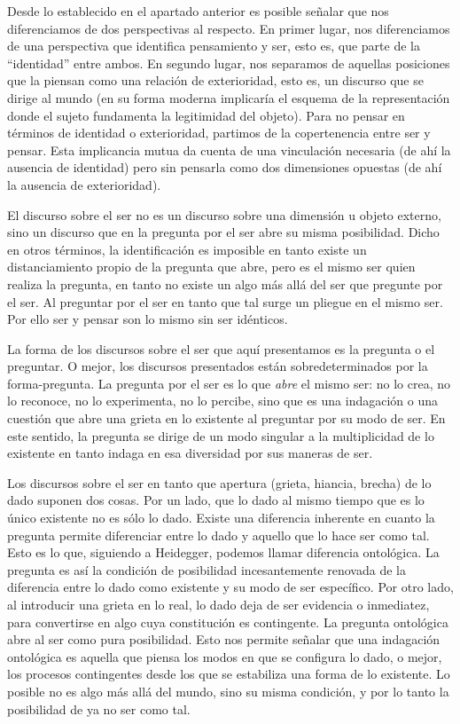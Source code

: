 \documentclass{book}
\begin{document}
Desde lo establecido en el apartado anterior es posible señalar que nos
diferenciamos de dos perspectivas al respecto. En primer lugar, nos
diferenciamos de una perspectiva que identifica pensamiento y ser, esto
es, que parte de la \enquote{identidad} entre ambos. En segundo lugar, nos
separamos de aquellas posiciones que la piensan como una relación de
exterioridad, esto es, un discurso que se dirige al mundo (en su forma
moderna implicaría el esquema de la representación donde el sujeto
fundamenta la legitimidad del objeto). Para no pensar en términos de
identidad o exterioridad, partimos de la copertenencia entre ser y
pensar. Esta implicancia mutua da cuenta de una vinculación necesaria
(de ahí la ausencia de identidad) pero sin pensarla como dos dimensiones
opuestas (de ahí la ausencia de exterioridad).

El discurso sobre el ser no es un discurso sobre una dimensión u objeto
externo, sino un discurso que en la pregunta por el ser abre su misma
posibilidad. Dicho en otros términos, la identificación es imposible en
tanto existe un distanciamiento propio de la pregunta que abre, pero es
el mismo ser quien realiza la pregunta, en tanto no existe un algo más
allá del ser que pregunte por el ser. Al preguntar por el ser en tanto
que tal surge un pliegue en el mismo ser. Por ello ser y pensar son lo
mismo sin ser idénticos.

La forma de los discursos sobre el ser que aquí presentamos es la
pregunta o el preguntar. O mejor, los discursos presentados están
sobredeterminados por la forma-pregunta. La pregunta por el ser es lo
que \emph{abre} el mismo ser: no lo crea, no lo reconoce, no lo
experimenta, no lo percibe, sino que es una indagación o una cuestión
que abre una grieta en lo existente al preguntar por su modo de ser. En
este sentido, la pregunta se dirige de un modo singular a la
multiplicidad de lo existente en tanto indaga en esa diversidad por sus
maneras de ser.

Los discursos sobre el ser en tanto que apertura (grieta, hiancia,
brecha) de lo dado suponen dos cosas. Por un lado, que lo dado al mismo
tiempo que es lo único existente no es sólo lo dado. Existe una
diferencia inherente en cuanto la pregunta permite diferenciar entre lo
dado y aquello que lo hace ser como tal. Esto es lo que, siguiendo a
Heidegger, podemos llamar diferencia ontológica. La pregunta es así la
condición de posibilidad incesantemente renovada de la diferencia entre
lo dado como existente y su modo de ser específico. Por otro lado, al
introducir una grieta en lo real, lo dado deja de ser evidencia o
inmediatez, para convertirse en algo cuya constitución es contingente.
La pregunta ontológica abre al ser como pura posibilidad. Esto nos
permite señalar que una indagación ontológica es aquella que piensa los
modos en que se configura lo dado, o mejor, los procesos contingentes
desde los que se estabiliza una forma de lo existente. Lo posible no es
algo más allá del mundo, sino su misma condición, y por lo tanto la
posibilidad de ya no ser como tal.
\end{document}
